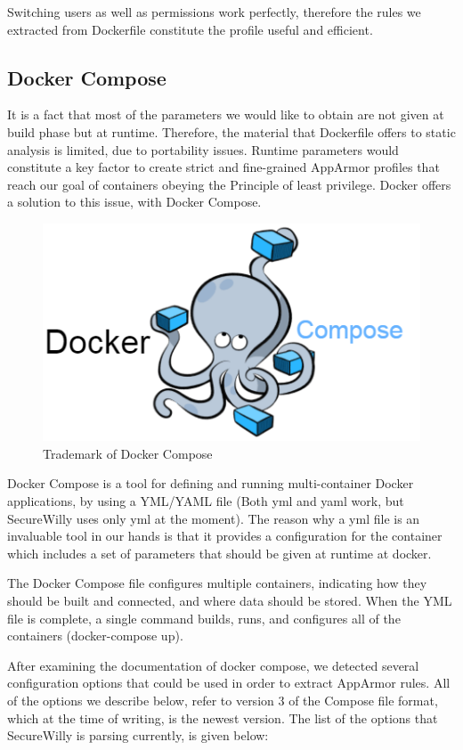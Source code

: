 Switching users as well as permissions work perfectly, therefore the rules we extracted from Dockerfile constitute the profile useful and efficient.

\subsection{Docker Compose} \label{dockcomp}
It is a fact that most of the parameters we would like to obtain are not given at build phase but at runtime. Therefore, the material that Dockerfile offers to static analysis is limited, due to portability issues. Runtime parameters would constitute a key factor to create strict and fine-grained AppArmor profiles that reach our goal of containers obeying the Principle of least privilege. Docker offers a solution to this issue, with Docker Compose.

\begin{figure}[h!]
  \centering
   \includegraphics[width=0.5\linewidth]{figures/dockercompose.png}
   \caption{Trademark of Docker Compose}
\end{figure}

Docker Compose is a tool for defining and running multi-container Docker applications, by using a YML/YAML file (Both yml and yaml work, but SecureWilly uses only yml at the moment). The reason why a yml file is an invaluable tool in our hands is that it provides a configuration for the container which includes a set of parameters that should be given at runtime at docker.

The Docker Compose file configures multiple containers, indicating how they should be built and connected, and where data should be stored. When the YML file is complete, a single command builds, runs, and configures all of the containers (docker-compose up).

After examining the documentation of docker compose, we detected several configuration options that could be used in order to extract AppArmor rules. All of the options we describe below, refer to version 3 of the Compose file format, which at the time of writing, is the newest version.
The list of the options that SecureWilly is parsing currently, is given below:

